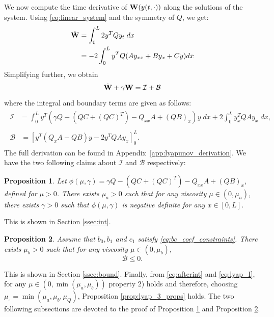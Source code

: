 \documentclass[11pt]{article}
\newtheorem{proposition}{Proposition}[section]
\begin{document}
We now compute the time derivative of ${\bf {W}}(y(t,\cdot))$ along the solutions of the system. Using \eqref{eq:linear_system} and the symmetry of $Q$, we get:
\begin{align}
    \dot{\bf {W}} &= \int_0^L 2 y^T Q y_t \; dx \\
    &= -2 \int_0^L y^T Q (Ay_{xx} + By_x + Cy) dx
\end{align}
Simplifying further, we obtain
\begin{equation}
\label{eq:afterint}
\dot{\bf {W}} + \gamma {\bf {W}} = \mathcal I + \mathcal B
\end{equation}
where the integral and boundary terms are given as follows:
\begin{align}
\begin{split}
    \mathcal I &= \int_0^L y^T\left(\gamma Q - (QC + (QC)^{T}) - Q_{xx}A + (QB)_x\right)y \; dx  + 2\int_0^L y^T_x QA y_x \; dx,
    \label{eq:lyap_I}
\end{split} \\
\begin{split}
    \mathcal B &= \left[ y^T(Q_xA - QB)y -2 y^TQAy_x \right]_0^L.
    \label{eq:lyap_B}
\end{split}
\end{align}
The full derivation can be found in Appendix~\ref{app:lyapunov_derivation}. 
{We have the two following claims about $\mathcal{I}$ and $\mathcal{B}$ respectively:} 

\begin{proposition}
\label{prop:inner}
{Let $\phi(\mu{, \gamma}) =  \gamma Q - (QC+(QC)^{T}) - Q_{xx}A + (QB)_x$, defined for $\mu > 0$.} There exists $\mu_{{a}}>0$ such that for any viscosity $\mu\in(0,\mu_{{a}})$, there exists $\gamma>0$ such that $\phi(\mu{, \gamma})$ is negative definite for any $x\in[0,L]$.     
\end{proposition}
{This is shown in Section \ref{ssec:int}.}
\begin{proposition}
\label{prop:boundary}
Assume that $b_0, b_1$ and $c_1$ satisfy \eqref{eq:bc_coef_constraints}. There exists ${\mu_{b}}>0$ such that for any viscosity $\mu\in(0,{\mu_{b}})$, 
$$\mathcal{B} \leq 0.$$
\end{proposition}
{This is shown in Section \ref{ssec:bound}.
Finally, from \eqref{eq:afterint} and \eqref{eq:lyap_I}, for any $\mu\in(0,\min(\mu_{a},\mu_{b}))$ property 2) holds and therefore, choosing ${\mu_{\circ}} = \min(\mu_{a},\mu_{b},\mu_{Q})$, Proposition \ref{prop:lyap_3_props} holds. 
{The two following subsections are devoted to the proof of Proposition \ref{prop:inner} and Proposition \ref{prop:boundary}.}
}
\end{document}
